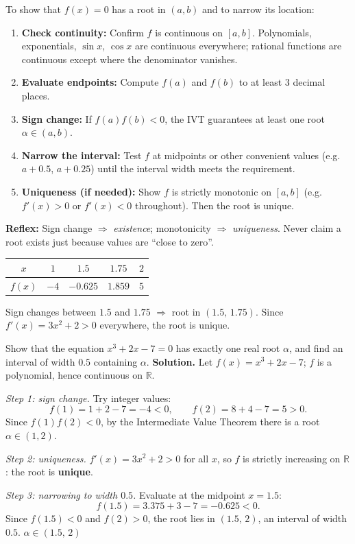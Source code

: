 \documentclass[11pt]{article}
\begin{document}
\begin{methode}
To show that $f(x)=0$ has a root in $(a,b)$ and to narrow its location:
\begin{enumerate}
\item \textbf{Check continuity:} Confirm $f$ is continuous on $[a,b]$. Polynomials, exponentials, $\sin x$, $\cos x$ are continuous everywhere; rational functions are continuous except where the denominator vanishes.
\item \textbf{Evaluate endpoints:} Compute $f(a)$ and $f(b)$ to at least 3 decimal places.
\item \textbf{Sign change:} If $f(a)f(b)<0$, the IVT guarantees at least one root $\alpha \in (a,b)$.
\item \textbf{Narrow the interval:} Test $f$ at midpoints or other convenient values (e.g. $a+0.5$, $a+0.25$) until the interval width meets the requirement.
\item \textbf{Uniqueness (if needed):} Show $f$ is strictly monotonic on $[a,b]$ (e.g. $f'(x)>0$ or $f'(x)<0$ throughout). Then the root is unique.
\end{enumerate}
\textbf{Reflex:} Sign change $\Rightarrow$ \emph{existence}; monotonicity $\Rightarrow$ \emph{uniqueness}. Never claim a root exists just because values are ``close to zero''.
\end{methode}

\begin{exemplebox}[Sign-change table for $f(x)=x^3+2x-7$]
\begin{center}
\begin{tabular}{|c|cccc|}\hline
$x$ & $1$ & $1.5$ & $1.75$ & $2$ \\ \hline
$f(x)$ & $-4$ & $-0.625$ & $1.859$ & $5$ \\ \hline
\end{tabular}
\end{center}
Sign changes between $1.5$ and $1.75$ $\Rightarrow$ root in $(1.5,\,1.75)$. Since $f'(x)=3x^2+2>0$ everywhere, the root is unique.
\end{exemplebox}

\begin{exoresolu}
Show that the equation $x^{3}+2x-7=0$ has exactly one real root $\alpha$, and find an interval of width $0.5$ containing $\alpha$.
\tcblower
\textbf{Solution.} Let $f(x)=x^{3}+2x-7$; $f$ is a polynomial, hence continuous on $\mathbb{R}$.

\emph{Step 1: sign change.} Try integer values:
\[ f(1)=1+2-7=-4<0,\qquad f(2)=8+4-7=5>0. \]
Since $f(1)f(2)<0$, by the Intermediate Value Theorem there is a root $\alpha\in(1,2)$.

\emph{Step 2: uniqueness.} $f'(x)=3x^{2}+2>0$ for all $x$, so $f$ is strictly increasing on $\mathbb{R}$: the root is \textbf{unique}.

\emph{Step 3: narrowing to width $0.5$.} Evaluate at the midpoint $x=1.5$:
\[ f(1.5)=3.375+3-7=-0.625<0. \]
Since $f(1.5)<0$ and $f(2)>0$, the root lies in $(1.5,\,2)$, an interval of width $0.5$. \qquad $\boxed{\alpha\in(1.5,\,2)}$
\end{exoresolu}
\end{document}
